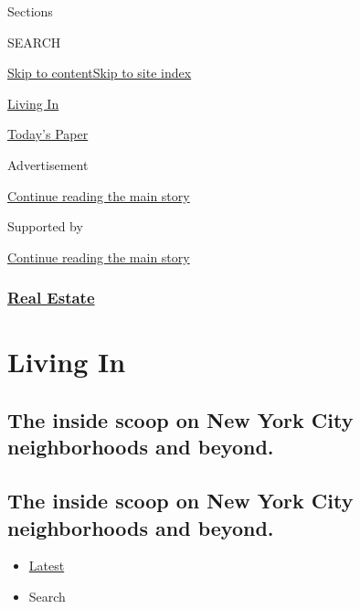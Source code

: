 Sections

SEARCH

\protect\hyperlink{site-content}{Skip to
content}\protect\hyperlink{site-index}{Skip to site index}

\href{https://www.nytimes.com/column/living-in}{Living In}

\href{https://myaccount.nytimes.com/auth/login?response_type=cookie\&client_id=vi}{}

\href{https://www.nytimes.com/section/todayspaper}{Today's Paper}

Advertisement

\protect\hyperlink{after-top}{Continue reading the main story}

Supported by

\protect\hyperlink{after-sponsor}{Continue reading the main story}

\hypertarget{real-estate}{%
\subsubsection{\texorpdfstring{\href{/section/realestate}{Real
Estate}}{Real Estate}}\label{real-estate}}

\hypertarget{living-in}{%
\section{Living In}\label{living-in}}

\hypertarget{the-inside-scoop-on-new-york-city-neighborhoods-and-beyond}{%
\subsection{The inside scoop on New York City neighborhoods and
beyond.}\label{the-inside-scoop-on-new-york-city-neighborhoods-and-beyond}}

\hypertarget{the-inside-scoop-on-new-york-city-neighborhoods-and-beyond-1}{%
\subsection{The inside scoop on New York City neighborhoods and
beyond.}\label{the-inside-scoop-on-new-york-city-neighborhoods-and-beyond-1}}

\begin{itemize}
\tightlist
\item
  \protect\hyperlink{stream-panel}{Latest}
\item
  Search
\end{itemize}

